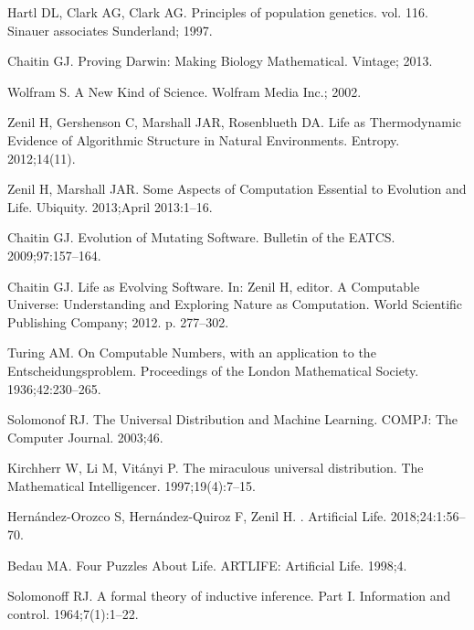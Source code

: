 \documentclass[10pt]{article}
\begin{document}

\begin{thebibliography}{10}

Hartl DL, Clark AG, Clark AG.
\newblock Principles of population genetics. vol. 116.
\newblock Sinauer associates Sunderland; 1997.

Chaitin GJ.
\newblock Proving Darwin: Making Biology Mathematical.
\newblock Vintage; 2013.

Wolfram S.
\newblock A {N}ew {K}ind of {S}cience.
\newblock Wolfram Media Inc.; 2002.

Zenil H, Gershenson C, Marshall JAR, Rosenblueth DA.
\newblock Life as Thermodynamic Evidence of Algorithmic Structure in Natural
  Environments.
\newblock Entropy. 2012;14(11).

Zenil H, Marshall JAR.
\newblock Some Aspects of Computation Essential to Evolution and Life.
\newblock Ubiquity. 2013;April 2013:1--16.

Chaitin GJ.
\newblock Evolution of Mutating Software.
\newblock Bulletin of the EATCS. 2009;97:157--164.

Chaitin GJ.
\newblock Life as Evolving Software.
\newblock In: Zenil H, editor. A Computable Universe: Understanding and
  Exploring Nature as Computation. World Scientific Publishing Company; 2012.
  p. 277--302.

Turing AM.
\newblock On Computable Numbers, with an application to the
  {E}ntscheidungsproblem.
\newblock Proceedings of the London Mathematical Society. 1936;42:230--265.

Solomonof RJ.
\newblock The Universal Distribution and Machine Learning.
\newblock COMPJ: The Computer Journal. 2003;46.

Kirchherr W, Li M, Vit{\'a}nyi P.
\newblock The miraculous universal distribution.
\newblock The Mathematical Intelligencer. 1997;19(4):7--15.

{Hern\'andez-Orozco} S, {Hern\'andez-Quiroz} F, {Zenil} H.
.
\newblock Artificial Life. 2018;24:1:56--70.

Bedau MA.
\newblock Four Puzzles About Life.
\newblock ARTLIFE: Artificial Life. 1998;4.

Solomonoff RJ.
\newblock A formal theory of inductive inference. Part I.
\newblock Information and control. 1964;7(1):1--22.


\end{thebibliography}
\end{document}
